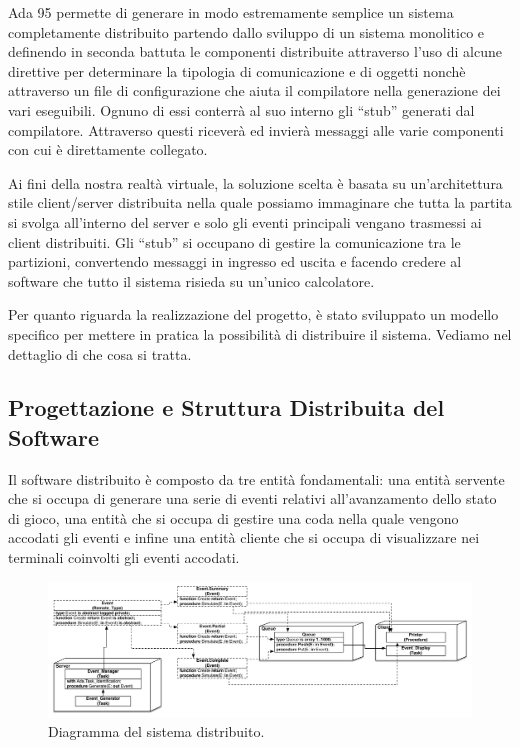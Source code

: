 \documentclass[aps,letterpaper,10pt]{article}
\begin{document}
Ada 95 permette di generare in modo estremamente semplice un sistema completamente distribuito partendo dallo sviluppo
di un sistema monolitico e definendo in seconda battuta le componenti distribuite attraverso l'uso di alcune direttive
per determinare la tipologia di comunicazione e di oggetti nonch\`e attraverso un file di configurazione che aiuta il
compilatore nella generazione dei vari eseguibili. Ognuno di essi conterr\`a al suo interno gli ``stub'' generati dal
compilatore. Attraverso questi ricever\`a ed invier\`a messaggi alle varie componenti con cui \`e direttamente
collegato. \vspace{3mm}

Ai fini della nostra realt\`a virtuale, la soluzione scelta \`e basata su un'architettura stile client/server
distribuita nella quale possiamo immaginare che tutta la partita si svolga all'interno del server e solo gli eventi
principali vengano trasmessi ai client distribuiti. Gli ``stub'' si occupano di gestire la comunicazione tra le
partizioni, convertendo messaggi in ingresso ed uscita e facendo credere al software che tutto il sistema risieda su
un'unico calcolatore. \vspace{3mm}

Per quanto riguarda la realizzazione del progetto, \`e stato sviluppato un modello specifico per mettere in pratica la
possibilit\`a di distribuire il sistema. Vediamo nel dettaglio di che cosa si tratta.

\subsection{Progettazione e Struttura Distribuita del Software}

Il software distribuito \`e composto da tre entit\`a fondamentali: una entit\`a servente che si occupa di generare una
serie di eventi relativi all'avanzamento dello stato di gioco, una entit\`a che si occupa di gestire una coda nella
quale vengono accodati gli eventi e infine una entit\`a cliente che si occupa di visualizzare nei terminali coinvolti
gli eventi accodati. \vspace{3mm}

\begin{figure}[H]
	\begin{center}
		\includegraphics[width=450px]{images/distributed-system.pdf}
	\end{center}
\caption{Diagramma del sistema distribuito.}
\end{figure}
\end{document}
